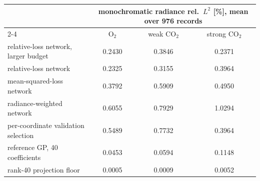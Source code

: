 \begin{tabular}{lccc}
\toprule
 & \multicolumn{3}{c}{monochromatic radiance rel.\ $L^2$ [\%], mean over 976 records} \\
\cmidrule(lr){2-4}
 & O$_2$ & weak CO$_2$ & strong CO$_2$ \\
\midrule
relative-loss network, larger budget & 0.2430 & 0.3846 & 0.2371 \\
relative-loss network & 0.2325 & 0.3155 & 0.3964 \\
mean-squared-loss network & 0.3792 & 0.5909 & 0.4950 \\
radiance-weighted network & 0.6055 & 0.7929 & 1.0294 \\
per-coordinate validation selection & 0.5489 & 0.7732 & 0.3964 \\
reference GP, 40 coefficients & 0.0453 & 0.0594 & 0.1148 \\
rank-40 projection floor & 0.0005 & 0.0009 & 0.0052 \\
\bottomrule
\end{tabular}

